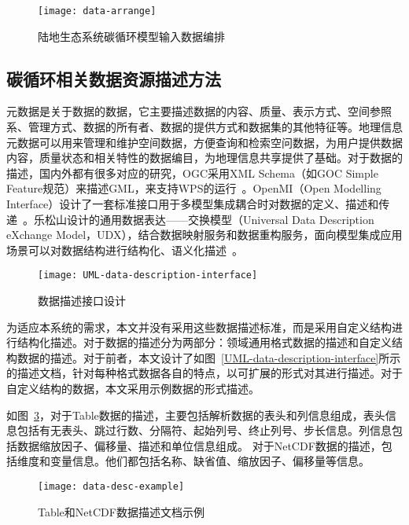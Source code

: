 \begin{figure}[!htbp]
    \centering
    \texttt{[image: data-arrange]}
    \caption{陆地生态系统碳循环模型输入数据编排}
    \label{fig:data-arrange}
\end{figure}

\subsection{碳循环相关数据资源描述方法}
\label{sec:data-desc}
元数据是关于数据的数据，它主要描述数据的内容、质量、表示方式、空间参照系、管理方式、数据的所有者、数据的提供方式和数据集的其他特征等。地理信息元数据可以用来管理和维护空间数据，方便查询和检索空问数据，为用户提供数据内容，质量状态和相关特性的数据编目，为地理信息共享提供了基础。对于数据的描述，国内外都有很多对应的研究，OGC采用XML Schema（如GOC Simple Feature规范）来描述GML，来支持WPS的运行~\cite{OGC-WPS}。OpenMI（Open Modelling Interface）设计了一套标准接口用于多模型集成耦合时对数据的定义、描述和传递~\cite{MOORE2005279}。乐松山设计的通用数据表达——交换模型（Universal Data Description eXchange Model，UDX），结合数据映射服务和数据重构服务，面向模型集成应用场景可以对数据结构进行结构化、语义化描述~\cite{乐松山2016面向地理模型共享与集成的数据适配方法研究}。

\begin{figure}[!htbp]
    \centering
    \texttt{[image: UML-data-description-interface]}
    \caption{数据描述接口设计}
    \label{fig:UML-data-description-interface}
\end{figure}

为适应本系统的需求，本文并没有采用这些数据描述标准，而是采用自定义结构进行结构化描述。对于数据的描述分为两部分：领域通用格式数据的描述和自定义结构数据的描述。对于前者，本文设计了如图~\ref{UML-data-description-interface}所示的描述文档，针对每种格式数据各自的特点，以可扩展的形式对其进行描述。对于自定义结构的数据，本文采用示例数据的形式描述。

如图~\ref{fig:data-desc-example}，对于Table数据的描述，主要包括解析数据的表头和列信息组成，表头信息包括有无表头、跳过行数、分隔符、起始列号、终止列号、步长信息。列信息包括数据缩放因子、偏移量、描述和单位信息组成。
对于NetCDF数据的描述，包括维度和变量信息。他们都包括名称、缺省值、缩放因子、偏移量等信息。

\begin{figure}[!htbp]
    \centering
    \texttt{[image: data-desc-example]}
    \caption{Table和NetCDF数据描述文档示例}
    \label{fig:data-desc-example}
\end{figure}

